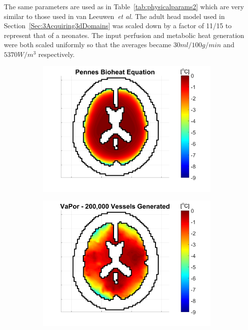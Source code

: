 \documentclass[11pt,english,a4paper,twoside,openright]{report}
\begin{document}
{{{{{{{The same parameters are used as in Table~\ref{tab:physicalparams2} which are very similar to those used in van Leeuwen~\textit{et al.} The adult head model used in Section~\ref{Sec:3Acquiring3dDomains} was scaled down by a factor of 11/15 to represent that of a neonates. The input perfusion and metabolic heat generation were both scaled uniformly so that the averages became $30ml/100g/min$ and $5370W/m^{3}$ respectively.

\begin{figure}[h]
	\centering
	\begin{subfigure}[b]{0.49\textwidth}
		\includegraphics[width=\textwidth]{Chapter5/Chapter5_Section4_Neonatal_Pennes}
	\end{subfigure}
	\begin{subfigure}[b]{0.49\textwidth}
		\includegraphics[width=\textwidth]{Chapter5/Chapter5_Section4_Neonatal}

\end{subfigure}
\end{figure}}}}}}}}
\end{document}
